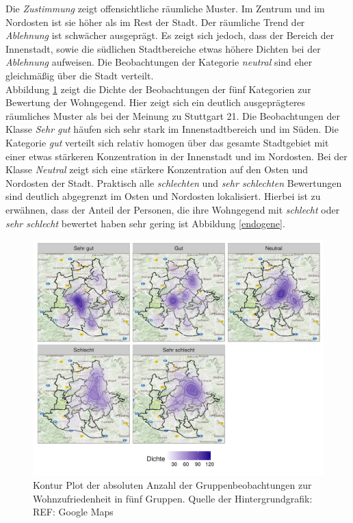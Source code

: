 \documentclass{Vorlage}
\begin{document}
Die \textit{Zustimmung} zeigt offensichtliche räumliche Muster. Im Zentrum und im Nordosten ist sie höher als im Rest der Stadt. Der räumliche Trend der \textit{Ablehnung} ist schwächer ausgeprägt. Es zeigt sich jedoch, dass der Bereich der Innenstadt, sowie die südlichen Stadtbereiche etwas höhere Dichten bei der \textit{Ablehnung} aufweisen. Die Beobachtungen der Kategorie \textit{neutral} sind eher gleichmäßig über die Stadt verteilt.\\
Abbildung \ref{XYWohnG5} zeigt die Dichte der Beobachtungen der fünf Kategorien zur Bewertung der Wohngegend. Hier zeigt sich ein deutlich ausgeprägteres räumliches Muster als bei der Meinung zu Stuttgart 21. Die Beobachtungen der Klasse \textit{Sehr gut} häufen sich sehr stark im Innenstadtbereich und im Süden. Die Kategorie \textit{gut} verteilt sich relativ homogen über das gesamte Stadtgebiet mit einer etwas stärkeren Konzentration in der Innenstadt und im Nordosten. Bei der Klasse \textit{Neutral} zeigt sich eine stärkere Konzentration auf den Osten und Nordosten der Stadt. Praktisch alle \textit{schlechten} und \textit{sehr schlechten} Bewertungen sind deutlich abgegrenzt im Osten und Nordosten lokalisiert. Hierbei ist zu erwähnen, dass der Anteil der Personen, die ihre Wohngegend mit \textit{schlecht} oder \textit{sehr schlecht} bewertet haben sehr gering ist Abbildung \ref{endogene}.\\

\begin{figure}[h]
 \begin{center}
 \includegraphics[scale=0.8]{Pictures/XYWohnG5.png}
 \caption{Kontur Plot der absoluten Anzahl der Gruppenbeobachtungen zur Wohnzufriedenheit in fünf Gruppen. Quelle der Hintergrundgrafik: REF: Google Maps}
 \label{XYWohnG5}
 \end{center}
\end{figure}
\end{document}
